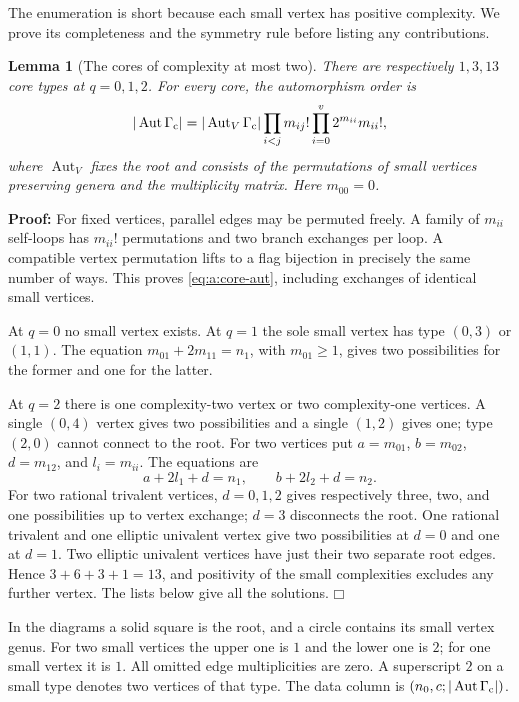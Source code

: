 \documentclass[a4paper,10pt]{article}
\numberwithin{equation}{section}
\theoremstyle{paperplain}
\newtheorem{lmm}[thm]{Lemma}
\theoremstyle{paperremark}
\theoremstyle{paperplain}
\newenvironment{prf}{\noindent \textbf{Proof: }}{\hfill $\mdlgwhtsquare$\par\addvspace{0.5\baselineskip}}
\begin{document}
The enumeration is short because each small vertex has positive
complexity. We prove its completeness and the symmetry rule before
listing any contributions.

\begin{lmm}[The cores of complexity at most two]\label{lmm:a:core-enumeration}
There are respectively $1,3,13$ core types at $q=0,1,2$. For every
core, the automorphism order is
\begin{equation}\label{eq:a:core-aut}
 |\operatorname{Aut}\Gamma_{\rm c}|=
 |\operatorname{Aut}_V\Gamma_{\rm c}|
       \prod_{i<j}m_{ij}!\prod_{i=0}^v2^{m_{ii}}m_{ii}!,
\end{equation}
where $\operatorname{Aut}_V$ fixes the root and consists of the
permutations of small vertices preserving genera and the multiplicity
matrix. Here $m_{00}=0$.
\end{lmm}
\begin{prf}
For fixed vertices, parallel edges may be permuted freely. A family
of $m_{ii}$ self-loops has $m_{ii}!$ permutations and two branch
exchanges per loop. A compatible vertex permutation lifts to a flag
bijection in precisely the same number of ways. This proves
\eqref{eq:a:core-aut}, including exchanges of identical small vertices.

At $q=0$ no small vertex exists. At $q=1$ the sole small vertex has
type $(0,3)$ or $(1,1)$. The equation $m_{01}+2m_{11}=n_1$,
with $m_{01}\geq1$, gives two possibilities for the former and one
for the latter.

At $q=2$ there is one complexity-two vertex or two complexity-one
vertices. A single $(0,4)$ vertex gives two possibilities and a single
$(1,2)$ gives one; type $(2,0)$ cannot connect to the root. For two
vertices put $a=m_{01}$, $b=m_{02}$, $d=m_{12}$, and $l_i=m_{ii}$.
The equations are
\[
 a+2l_1+d=n_1,\qquad b+2l_2+d=n_2.
\]
For two rational trivalent vertices, $d=0,1,2$ gives respectively
three, two, and one possibilities up to vertex exchange; $d=3$
disconnects the root. One rational trivalent and one elliptic univalent
vertex give two possibilities at $d=0$ and one at $d=1$. Two elliptic
univalent vertices have just their two separate root edges. Hence
$3+6+3+1=13$, and positivity of the small complexities excludes any
further vertex. The lists below give all the solutions.
\end{prf}

In the diagrams a solid square is the root, and a circle contains its
small vertex genus. For two small vertices the upper one is $1$ and
the lower one is $2$; for one small vertex it is $1$. All omitted
edge multiplicities are zero. A superscript $2$ on a small type denotes
two vertices of that type. The data column is
$(n_0,c;|\operatorname{Aut}\Gamma_{\rm c}|)$.
\end{document}
